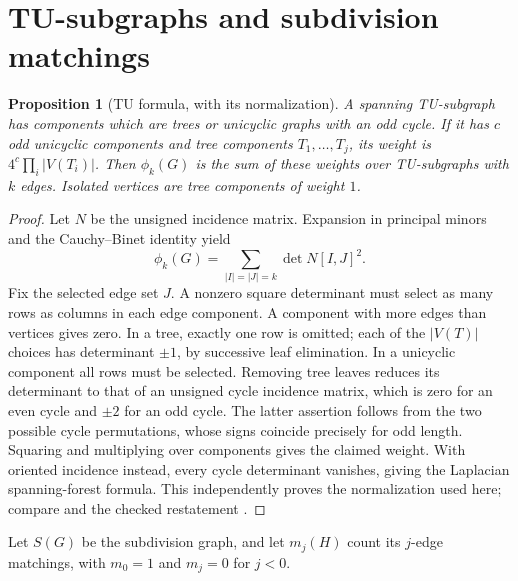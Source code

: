 \documentclass[12pt]{amsart}
\newtheorem{prop}[thm]{Proposition}
\theoremstyle{definition}
\theoremstyle{remark}
\numberwithin{equation}{section}
\begin{document}
\section{TU-subgraphs and subdivision matchings}
\begin{prop}[TU formula, with its normalization]\label{en:TU}
A spanning TU-subgraph has components which are trees or unicyclic
graphs with an odd cycle. If it has $c$ odd unicyclic components and tree
components $T_1,\ldots,T_j$, its weight is
$4^c\prod_i|V(T_i)|$. Then $\phi_k(G)$ is the sum of these weights over
TU-subgraphs with $k$ edges. Isolated vertices are tree components of
weight $1$.
\end{prop}
\begin{proof}
Let $N$ be the unsigned incidence matrix. Expansion in principal minors
and the Cauchy--Binet identity yield
\[
 \phi_k(G)=\sum_{|I|=|J|=k}\det N[I,J]^2.
\]
Fix the selected edge set $J$. A nonzero square determinant must select
as many rows as columns in each edge component. A component with more
edges than vertices gives zero. In a tree, exactly one row is omitted;
each of the $|V(T)|$ choices has determinant $\pm1$, by successive leaf
elimination. In a unicyclic component all rows must be selected. Removing
tree leaves reduces its determinant to that of an unsigned cycle incidence
matrix, which is zero for an even cycle and $\pm2$ for an odd cycle.
The latter assertion follows from the two possible cycle permutations,
whose signs coincide precisely for odd length. Squaring and multiplying
over components gives the claimed weight. With oriented incidence instead,
every cycle determinant vanishes, giving the Laplacian spanning-forest
formula. This independently proves the normalization used here; compare
\cite{en-crs} and the checked restatement \cite[Lemma 2.1, p.~4217]{en-zw}.
\end{proof}

Let $S(G)$ be the subdivision graph, and let $m_j(H)$ count its
$j$-edge matchings, with $m_0=1$ and $m_j=0$ for $j<0$.
\end{document}
